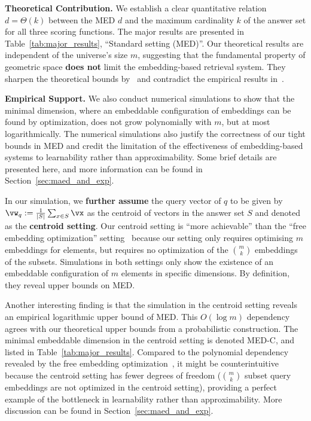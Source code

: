 \textbf{Theoretical Contribution.} We establish a clear quantitative relation $d = \Theta(k)$ between the MED $d$ and the maximum cardinality $k$ of the answer set for all three scoring functions. The major results are presented in Table~\ref{tab:major_results}, ``Standard setting (MED)''. Our theoretical results are independent of the universe's size $m$, suggesting that the fundamental property of geometric space \textbf{does not} limit the embedding-based retrieval system. They sharpen the theoretical bounds by~\citet{weller2025theoretical} and contradict the empirical results in~\citet{weller2025theoretical}.

\textbf{Empirical Support.} We also conduct numerical simulations to show that the minimal dimension, where an embeddable configuration of embeddings can be found by optimization, does not grow polynomially with $m$, but at most logarithmically. The numerical simulations also justify the correctness of our tight bounds in MED and credit the limitation of the effectiveness of embedding-based systems to learnability rather than approximability. Some brief details are presented here, and more information can be found in Section~\ref{sec:maed_and_exp}.



In our simulation, we \textbf{further assume} the query vector of $q$ to be given by $\vw_q:= \frac{1}{|S|}\sum_{x\in S} \vx$ as the centroid of vectors in the answer set $S$ and denoted as the \textbf{centroid setting}. Our centroid setting is ``more achievable'' than the ``free embedding optimization'' setting~\citep{weller2025theoretical} because our setting only requires optimising $m$ embeddings for elements, but requires no optimization of the $\binom{m}{k}$ embeddings of the subsets. Simulations in both settings only show the existence of an embeddable configuration of $m$ elements in specific dimensions. By definition, they reveal upper bounds on MED. 

Another interesting finding is that the simulation in the centroid setting reveals an empirical logarithmic upper bound of MED. This $O(\log m)$ dependency agrees with our theoretical upper bounds from a probabilistic construction. The minimal embeddable dimension in the centroid setting is denoted MED-C, and listed in Table~\ref{tab:major_results}. Compared to the polynomial dependency revealed by the free embedding optimization~\citep{weller2025theoretical}, it might be counterintuitive because the centroid setting has fewer degrees of freedom ($\binom{m}{k}$ subset query embeddings are not optimized in the centroid setting), providing a perfect example of the bottleneck in learnability rather than approximability. More discussion can be found in Section~\ref{sec:maed_and_exp}.

